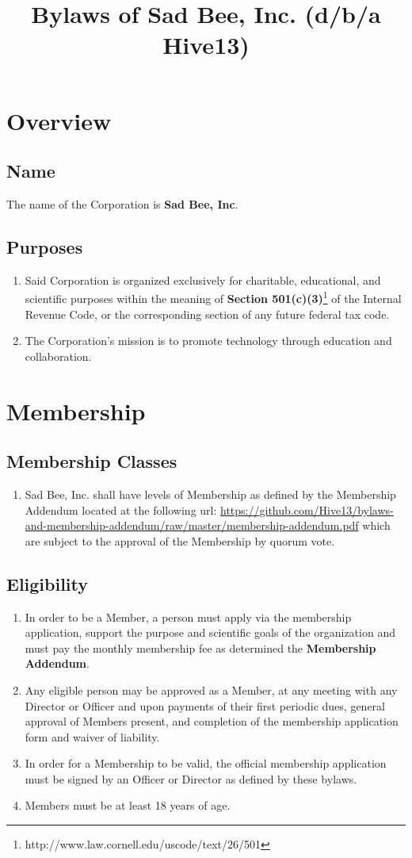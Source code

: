 \documentclass{article}
\title{Bylaws of Sad Bee, Inc. (d/b/a Hive13)}
\begin{document}
\maketitle
\section{Overview}
\subsection{Name}
The name of the Corporation is \textbf{Sad Bee, Inc}.
\subsection{Purposes}
\begin{enumerate}
    \item Said Corporation is organized exclusively for charitable, educational,
and scientific purposes within the meaning of \textbf{Section 501(c)(3)}\footnote{http://www.law.cornell.edu/uscode/text/26/501} of the Internal
Revenue Code, or the corresponding section of any future federal tax code.
    \item The Corporation's mission is to promote technology through education and
collaboration.
\end{enumerate}
\section{Membership}
\subsection{Membership Classes}
\begin{enumerate}
    \item Sad Bee, Inc. shall have levels of Membership as defined by the
      Membership Addendum located at the following url: \url{https://github.com/Hive13/bylaws-and-membership-addendum/raw/master/membership-addendum.pdf} which are
    subject to the approval of the Membership by quorum vote.
\end{enumerate}
\subsection{Eligibility}
\begin{enumerate}
    \item In order to be a Member, a person must apply via the membership
    application, support the purpose and scientific goals of the organization
    and must pay the monthly membership fee as determined the \textbf{Membership Addendum}.
    \item Any eligible person may be approved as a Member, at any meeting with
    any Director or Officer and upon payments of their first periodic dues,
    general approval of Members present, and completion of the membership
    application form and waiver of liability.
    \item In order for a Membership to be valid, the official membership
    application must be signed by an Officer or Director as defined by these
    bylaws.
    \item Members must be at least 18 years of age.
\end{enumerate}
\end{document}
